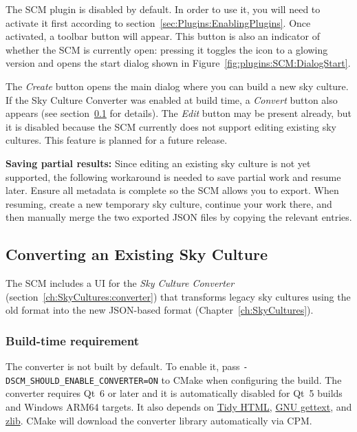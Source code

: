The SCM plugin is disabled by default.
In order to use it, you will need to activate it first according to section~\ref{sec:Plugins:EnablingPlugins}.
Once activated, a toolbar button  will appear.
This button is also an indicator of whether the SCM is currently open: pressing it toggles the icon to a glowing version and opens the start dialog shown in Figure~\ref{fig:plugins:SCM:DialogStart}.

The \textit{Create} button opens the main dialog where you can build a new sky culture.
If the Sky Culture Converter was enabled at build time, a \textit{Convert} button also appears (see section~\ref{sec:plugins:SCM:Converting} for details).
The \textit{Edit} button may be present already, but it is disabled because the SCM currently does not support editing existing sky cultures.
This feature is planned for a future release.

\noindent\textbf{Saving partial results:} Since editing an existing sky culture is not yet supported, the following workaround is needed to save partial work and resume later.
Ensure all metadata is complete so the SCM allows you to export.
When resuming, create a new temporary sky culture, continue your work there, and then manually merge the two exported JSON files by copying the relevant entries.

\subsection{Converting an Existing Sky Culture}
\label{sec:plugins:SCM:Converting}

The SCM includes a UI for the \textit{Sky Culture Converter} (section~\ref{ch:SkyCultures:converter}) that transforms legacy sky cultures using the old  format into the new JSON-based format (Chapter~\ref{ch:SkyCultures}).

\subsubsection*{Build-time requirement}
The converter is not built by default.
To enable it, pass \texttt{-DSCM\_SHOULD\_ENABLE\_CONVERTER=ON} to CMake when configuring the build.
The converter requires Qt~6 or later and it is automatically disabled for Qt~5 builds and Windows ARM64 targets.
It also depends on \href{https://www.html-tidy.org/}{Tidy HTML}, \href{https://www.gnu.org/software/gettext/}{GNU gettext}, and \href{https://www.zlib.net}{zlib}. 
CMake will download the converter library automatically via CPM.

